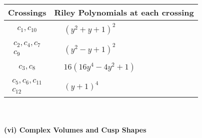 \documentclass[1p]{elsarticle_modified}
\theoremstyle{definition}
\begin{document}
\begin{tabular}{m{50pt}|m{274pt}}
Crossings & \hspace{64pt}Riley Polynomials at each crossing \\
\hline $$\begin{aligned}c_{1},c_{10}\end{aligned}$$&$\begin{aligned}
&(y^2+y+1)^2
\end{aligned}$\\
\hline $$\begin{aligned}c_{2},c_{4},c_{7}\\c_{9}\end{aligned}$$&$\begin{aligned}
&(y^2- y+1)^2
\end{aligned}$\\
\hline $$\begin{aligned}c_{3},c_{8}\end{aligned}$$&$\begin{aligned}
&16(16 y^4-4 y^2+1)
\end{aligned}$\\
\hline $$\begin{aligned}c_{5},c_{6},c_{11}\\c_{12}\end{aligned}$$&$\begin{aligned}
&(y+1)^4
\end{aligned}$\\
\hline
\end{tabular}\\~\\
\newpage\flushleft \textbf{(vi) Complex Volumes and Cusp Shapes}
\end{document}
